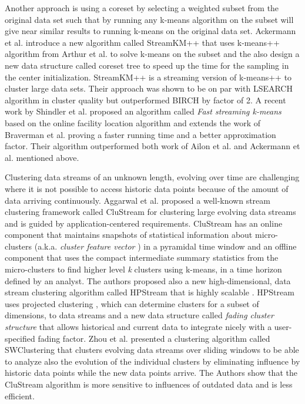Another approach is using a coreset by selecting a weighted subset from the original data set such that by running any k-means algorithm on the subset will give near similar results to running k-means on the original data set. Ackermann et al. \citep{Ackermann:2010} introduce a new algorithm called StreamKM++ that uses k-means++ algorithm from Arthur et al. \citep{Arthur:2007} to solve k-means on the subset and the also design a new data structure called coreset tree to speed up the time for the sampling in the center initialization. StreamKM++ is a streaming version of k-means++ to cluster large data sets. Their approach was shown to be on par with LSEARCH algorithm in cluster quality but outperformed BIRCH by factor of 2. A recent work by Shindler et al. \citep{Shindler:2011} proposed an algorithm called \textit{Fast streaming k-means} based on the online facility location algorithm \citep{Meyerson:2001} and extends the work of Braverman et al. \citep{Braverman:2011} proving a faster running time and a better approximation factor. Their algorithm outperformed both work of Ailon et al. \citep{Ailon:2009} and Ackermann et al. \citep{Ackermann:2010} mentioned above.

Clustering data streams of an unknown length, evolving over time \citep{Aggarwal:2002, Aggarwal:2003Evolving} are challenging where it is not possible to access historic data points because of the amount of data arriving continuously. Aggarwal et al. \citep{Aggarwal:2003} proposed a well-known stream clustering framework called CluStream for clustering large evolving data streams and is guided by application-centered requirements. CluStream has an online component that maintains snapshots of statistical information about micro-clusters (a.k.a. \textit{cluster feature vector} \citep{Zhang:1996}) in a pyramidal time window and an offline component that uses the compact intermediate summary statistics from the micro-clusters to find higher level \textit{k} clusters using k-means, in a time horizon defined by an analyst. The authors proposed also a new high-dimensional, data stream clustering algorithm called HPStream that is highly scalable \citep{Aggarwal:2004}. HPStream uses projected clustering \citep{Aggarwal:1999}, which can determine clusters for a subset of dimensions, to data streams and a new data structure called \textit{fading cluster structure} that allows historical and current data to integrate nicely with a user-specified fading factor. Zhou et al. \citep{Zhou:2008} presented a clustering algorithm called SWClustering that clusters evolving data streams over sliding windows to be able to analyze also the evolution of the individual clusters by eliminating influence by historic data points while the new data points arrive. The Authors show that the CluStream algorithm is more sensitive to influences of outdated data and is less efficient.

